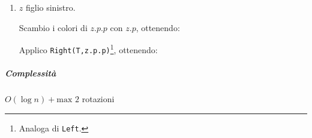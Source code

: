 \begin{enumerate}
\begin{enumerate}[label=($2.\arabic*$)]
        \item $z$ figlio sinistro. \label{rbinsert:2.2}
        \begin{center}
        \end{center}
        Scambio i colori di $z.p.p$ con $z.p$, ottenendo:
        \begin{center}
        \end{center}
        Applico \texttt{Right(T,z.p.p)}\footnote{Analoga di \texttt{Left}.}, ottenendo:
        \begin{center}
        \end{center}
    \end{enumerate}
\end{enumerate}




\subparagraph{Complessità} $O(\log n) + \text{max } 2$ rotazioni

